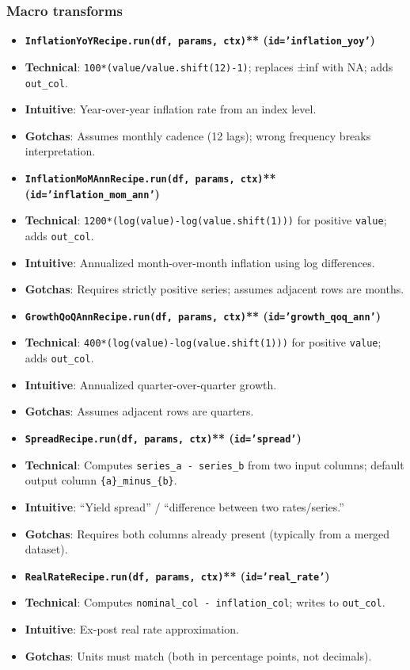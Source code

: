\documentclass[11pt]{article}
\begin{document}
\subsubsection{Macro transforms}

\begin{itemize}[leftmargin=*,nosep]
\item \textbf{\texttt{InflationYoYRecipe.run(df, params, ctx)}** (\texttt{id='inflation\_yoy'})}
\item \textbf{Technical}: \texttt{100*(value/value.shift(12)-1)}; replaces ±inf with NA; adds \texttt{out\_col}.
\item \textbf{Intuitive}: Year-over-year inflation rate from an index level.
\item \textbf{Gotchas}: Assumes monthly cadence (12 lags); wrong frequency breaks interpretation.
\item \textbf{\texttt{InflationMoMAnnRecipe.run(df, params, ctx)}** (\texttt{id='inflation\_mom\_ann'})}
\item \textbf{Technical}: \texttt{1200*(log(value)-log(value.shift(1)))} for positive \texttt{value}; adds \texttt{out\_col}.
\item \textbf{Intuitive}: Annualized month-over-month inflation using log differences.
\item \textbf{Gotchas}: Requires strictly positive series; assumes adjacent rows are months.
\item \textbf{\texttt{GrowthQoQAnnRecipe.run(df, params, ctx)}** (\texttt{id='growth\_qoq\_ann'})}
\item \textbf{Technical}: \texttt{400*(log(value)-log(value.shift(1)))} for positive \texttt{value}; adds \texttt{out\_col}.
\item \textbf{Intuitive}: Annualized quarter-over-quarter growth.
\item \textbf{Gotchas}: Assumes adjacent rows are quarters.
\item \textbf{\texttt{SpreadRecipe.run(df, params, ctx)}** (\texttt{id='spread'})}
\item \textbf{Technical}: Computes \texttt{series\_a - series\_b} from two input columns; default output column \texttt{\{a\}\_minus\_\{b\}}.
\item \textbf{Intuitive}: “Yield spread” / “difference between two rates/series.”
\item \textbf{Gotchas}: Requires both columns already present (typically from a merged dataset).
\item \textbf{\texttt{RealRateRecipe.run(df, params, ctx)}** (\texttt{id='real\_rate'})}
\item \textbf{Technical}: Computes \texttt{nominal\_col - inflation\_col}; writes to \texttt{out\_col}.
\item \textbf{Intuitive}: Ex-post real rate approximation.
\item \textbf{Gotchas}: Units must match (both in percentage points, not decimals).
\end{itemize}
\end{document}
